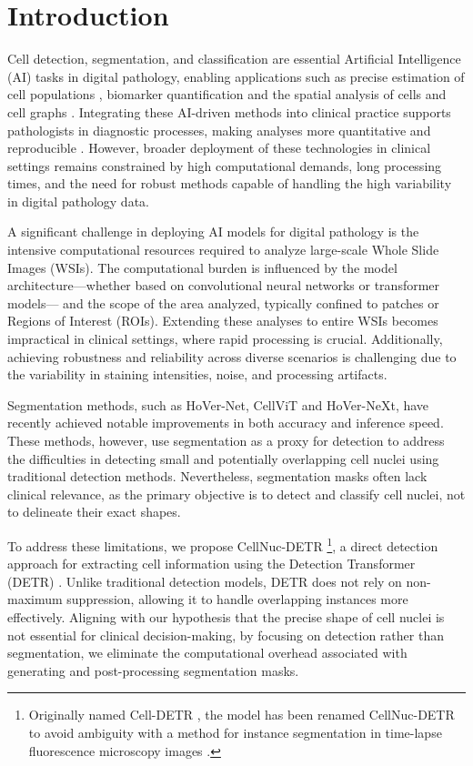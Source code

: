 \section{Introduction}
\label{sec:intro}

Cell detection, segmentation, and classification are essential Artificial Intelligence (AI) tasks in digital pathology, enabling applications such as precise estimation of cell populations \cite{lewis2023automated}, biomarker quantification \cite{lara2021quantitative} and the spatial analysis of cells and cell graphs \cite{sobhani2021artificial, pati2022hierarchical, pina2022self, wang2024breast}. Integrating these AI-driven methods into clinical practice supports pathologists in diagnostic processes, making analyses more quantitative and reproducible \cite{garcia2016trying}. However, broader deployment of these technologies in clinical settings remains constrained by high computational demands, long processing times, and the need for robust methods capable of handling the high variability in digital pathology data.

A significant challenge in deploying AI models for digital pathology is the intensive computational resources required to analyze large-scale Whole Slide Images (WSIs). The computational burden is influenced by the model architecture—whether based on convolutional neural networks or transformer models— and the scope of the area analyzed, typically confined to patches or Regions of Interest (ROIs). Extending these analyses to entire WSIs becomes impractical in clinical settings, where rapid processing is crucial. Additionally, achieving robustness and reliability across diverse scenarios is challenging due to the variability in staining intensities, noise, and processing artifacts.

Segmentation methods, such as HoVer-Net\cite{graham2019hover}, CellViT\cite{hörst2023cellvit} and HoVer-NeXt\cite{baumann2024hover}, have recently achieved notable improvements in both accuracy and inference speed. These methods, however, use segmentation as a proxy for detection to address the difficulties in detecting small and potentially overlapping cell nuclei using traditional detection methods. Nevertheless, segmentation masks often lack clinical relevance, as the primary objective is to detect and classify cell nuclei, not to delineate their exact shapes.

To address these limitations, we propose CellNuc-DETR \cite{pina2024cell}\footnote{Originally named Cell-DETR \cite{pina2024cell}, the model has been renamed CellNuc-DETR to avoid ambiguity with a method for instance segmentation in time-lapse fluorescence microscopy images \cite{prangemeier2020c}.}, a direct detection approach for extracting cell information using the Detection Transformer (DETR) \cite{carion2020end}. Unlike traditional detection models, DETR does not rely on non-maximum suppression, allowing it to handle overlapping instances more effectively. Aligning with our hypothesis that the precise shape of cell nuclei is not essential for clinical decision-making, by focusing on detection rather than segmentation, we eliminate the computational overhead associated with generating and post-processing segmentation masks.

